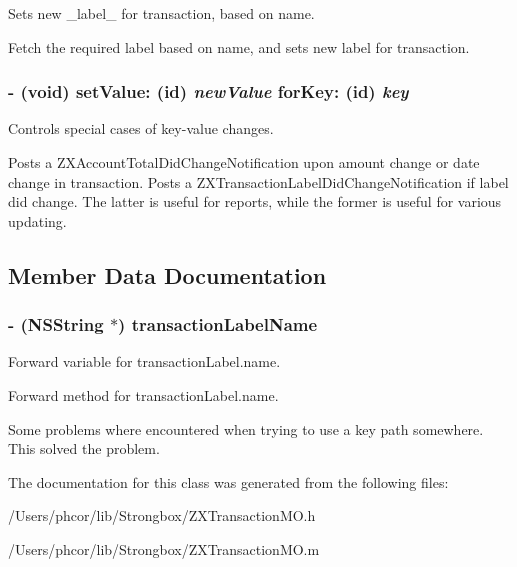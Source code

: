 Sets new \_\-label\_\- for transaction, based on name. 

Fetch the required label based on name, and sets new label for transaction. \hypertarget{interface_z_x_transaction_m_o_146047cdc02454b553bfcbbeb5b200ba}{
\subsubsection[{setValue:forKey:}]{\setlength{\rightskip}{0pt plus 5cm}- (void) setValue: (id) {\em newValue}\/ forKey: (id) {\em key}}}
\label{interface_z_x_transaction_m_o_146047cdc02454b553bfcbbeb5b200ba}


Controls special cases of key-value changes. 

Posts a ZXAccountTotalDidChangeNotification upon amount change or date change in transaction. Posts a ZXTransactionLabelDidChangeNotification if label did change. The latter is useful for reports, while the former is useful for various updating. 

\subsection{Member Data Documentation}
\hypertarget{interface_z_x_transaction_m_o_1aa04c3a4903ba99f666a55868cd8d5a}{
\subsubsection[{transactionLabelName}]{\setlength{\rightskip}{0pt plus 5cm}- (NSString $\ast$) {\bf transactionLabelName}}}
\label{interface_z_x_transaction_m_o_1aa04c3a4903ba99f666a55868cd8d5a}


Forward variable for transactionLabel.name. 

Forward method for transactionLabel.name.

Some problems where encountered when trying to use a key path somewhere. This solved the problem. 

The documentation for this class was generated from the following files:\begin{CompactItemize}
\item 
/Users/phcor/lib/Strongbox/ZXTransactionMO.h\item 
/Users/phcor/lib/Strongbox/ZXTransactionMO.m\end{CompactItemize}
